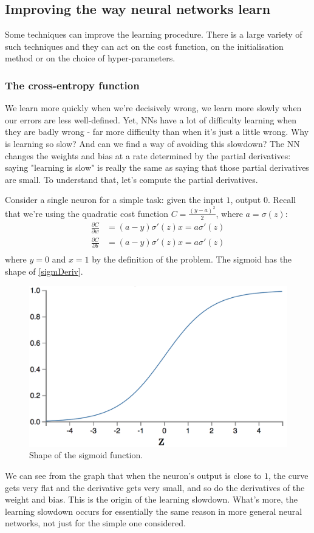 \subsection{Improving the way neural networks learn}
Some techniques can improve the learning procedure. There is a large variety of such techniques and they can act on the cost function, on the initialisation method or on the choice of hyper-parameters.

\subsubsection{The cross-entropy function}
We learn more quickly when we're decisively wrong, we learn more slowly when our errors are less well-defined. Yet, NNs have a lot of difficulty learning when they are badly wrong - far more difficulty than when it's just a little wrong. Why is learning so slow? And can we find a way of avoiding this slowdown? The NN changes the weights and bias at a rate determined by the partial derivatives: saying "learning is slow" is really the same as saying that those partial derivatives are small. To understand that, let's compute the partial derivatives. 

Consider a single neuron for a simple task: given the input $1$, output $0$. Recall that we're using the quadratic cost function $C= \frac{(y-a)^2}{2}$, where $a = \sigma(z)$:
\begin{equation}
\begin{aligned}
\frac{\partial C}{\partial w} &=(a-y)\sigma'(z) x = a\sigma'(z)\\
\frac{\partial C}{\partial b} &=(a-y)\sigma'(z) x = a\sigma'(z)\\
\end{aligned}
\end{equation}
where $y=0$ and $x=1$ by the definition of the problem. The sigmoid has the shape of \autoref{sigmDeriv}.
\begin{figure}
\centering
\includegraphics[scale=0.25]{img/sigmoid2}
\caption{Shape of the sigmoid function.}
\label{sigmDeriv}
\end{figure}
We can see from the graph that when the neuron's output is close to $1$, the curve gets very flat and the derivative gets very small, and so do the derivatives of the weight and bias. This is the origin of the learning slowdown. What's more, the learning slowdown occurs for essentially the same reason in more general neural networks, not just for the simple one considered.

